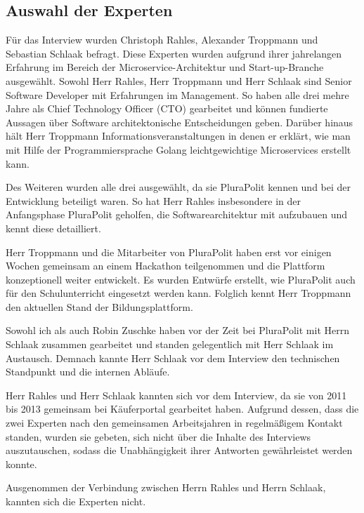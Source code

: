 \subsection{Auswahl der Experten}

Für das Interview wurden Christoph Rahles, Alexander Troppmann und Sebastian Schlaak befragt.
Diese Experten wurden aufgrund ihrer jahrelangen Erfahrung im Bereich der Microservice-Architektur und Start-up-Branche ausgewählt. Sowohl Herr Rahles, Herr Troppmann und Herr Schlaak sind Senior Software Developer mit Erfahrungen im Management. So haben alle drei mehre Jahre als Chief Technology Officer (CTO) gearbeitet und können fundierte Aussagen über Software architektonische Entscheidungen geben. Darüber hinaus hält Herr Troppmann Informationsveranstaltungen in denen er erklärt, wie man mit Hilfe der Programmiersprache Golang leichtgewichtige Microservices erstellt kann.

Des Weiteren wurden alle drei ausgewählt, da sie PluraPolit kennen und bei der Entwicklung beteiligt waren. So hat Herr Rahles insbesondere in der Anfangsphase PluraPolit geholfen, die Softwarearchitektur mit aufzubauen und kennt diese detailliert.

Herr Troppmann und die Mitarbeiter von PluraPolit haben erst vor einigen Wochen gemeinsam an einem Hackathon teilgenommen und die Plattform konzeptionell weiter entwickelt. Es wurden Entwürfe erstellt, wie PluraPolit auch für den Schulunterricht eingesetzt werden kann. Folglich kennt Herr Troppmann den aktuellen Stand der Bildungsplattform.

Sowohl ich als auch Robin Zuschke haben vor der Zeit bei PluraPolit mit Herrn Schlaak zusammen gearbeitet und standen gelegentlich mit Herr Schlaak im Austausch. Demnach kannte Herr Schlaak vor dem Interview den technischen Standpunkt und die internen Abläufe.

Herr Rahles und Herr Schlaak kannten sich vor dem Interview, da sie von 2011 bis 2013 gemeinsam bei Käuferportal gearbeitet haben. Aufgrund dessen, dass die zwei Experten nach den gemeinsamen Arbeitsjahren in regelmäßigem Kontakt standen, wurden sie gebeten, sich nicht über die Inhalte des Interviews auszutauschen, sodass die Unabhängigkeit ihrer Antworten gewährleistet werden konnte.

Ausgenommen der Verbindung zwischen Herrn Rahles und Herrn Schlaak, kannten sich die Experten nicht.
